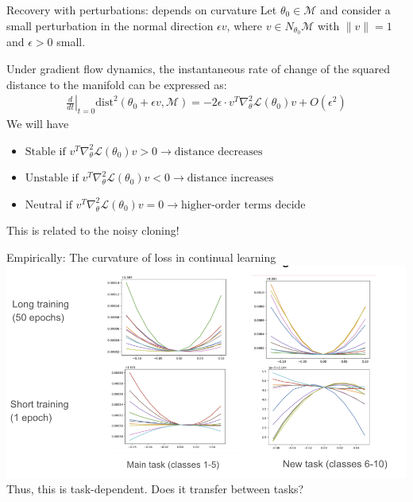 \documentclass{beamer}
\begin{document}
\begin{frame}{Recovery with perturbations: depends on curvature}
    Let $\theta_0 \in \mathcal{M}$ and consider a small perturbation in the normal direction $\epsilon v$, where $v \in N_{\theta_0}\mathcal{M}$ with $\|v\| = 1$ and $\epsilon > 0$ small. 
    
    Under gradient flow dynamics, the instantaneous rate of change of the squared distance to the manifold can be expressed as:
    \begin{align}
        \left.\frac{d}{dt}\right|_{t=0} \text{dist}^2(\theta_0 + \epsilon v, \mathcal{M}) = -2\epsilon \cdot v^T\nabla_{\theta}^2\mathcal{L}(\theta_0)v + O(\epsilon^2)
    \end{align}
We will have 
    \begin{itemize}
      \item $\text{Stable if } v^T\nabla_{\theta}^2\mathcal{L}(\theta_0)v > 0 \rightarrow \text{distance decreases} $
      \item $\text{Unstable if } v^T\nabla_{\theta}^2\mathcal{L}(\theta_0)v < 0 \rightarrow \text{distance increases} $
      \item $\text{Neutral if } v^T\nabla_{\theta}^2\mathcal{L}(\theta_0)v = 0 \rightarrow \text{higher-order terms decide} $
    \end{itemize}
    \begin{block}{}
              \item This is related to the noisy cloning! 
    \end{block}
\end{frame}

\begin{frame}{Empirically: The curvature of loss in continual learning }
    \includegraphics[width=\textwidth]{images/hess.png}
    Thus, this is task-dependent. Does it transfer between tasks? 
\end{frame}
\end{document}
